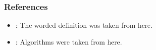 \subsubsection{References}
\begin{itemize}
    \item \href{https://en.wikipedia.org/wiki/Heap_(data_structure)}{}: The worded definition was taken from here.
    \item \href{https://en.wikipedia.org/wiki/Binary_heap}{}: Algorithms were taken from here.
\end{itemize}

